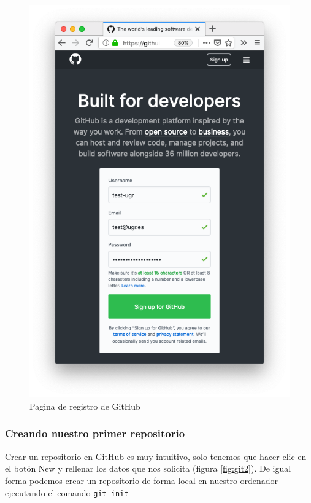 \begin{figure}[H]
\centering
\includegraphics[width=1.0\textwidth]{../images/git1}
\caption{Pagina de registro de GitHub}
\label{fig:git1}
\end{figure}

\subsubsection{Creando nuestro primer repositorio}

Crear un repositorio en GitHub es muy intuitivo, solo tenemos que hacer clic en el botón New y rellenar los datos que nos solicita (figura \ref{fig:git2}). De igual forma podemos crear un repositorio de forma local en nuestro ordenador ejecutando el comando \texttt{git init}

